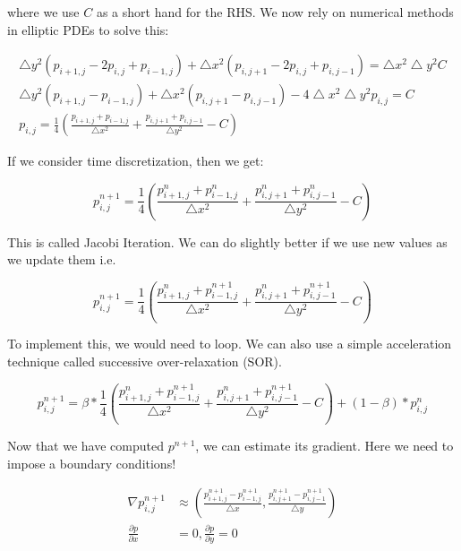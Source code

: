 \documentclass[12pt]{article}
\begin{document}
where we use $C$ as a short hand for the RHS. We now rely on numerical methods in elliptic PDEs to solve this:

\begin{align}
    \bigtriangleup y^2 (p_{i+1,j}-2p_{i,j}+p_{i-1,j}) + \bigtriangleup x^2 (p_{i,j+1}-2p_{i,j}+p_{i,j-1}) = \bigtriangleup x^2 \bigtriangleup y^2 C \\
    \bigtriangleup y^2 (p_{i+1,j} - p_{i-1,j}) + \bigtriangleup x^2 (p_{i,j+1} - p_{i,j-1}) - 4\bigtriangleup x^2 \bigtriangleup y^2 p_{i,j} = C \\
    p_{i,j} = \frac{1}{4}(\frac{p_{i+1,j} + p_{i-1,j}}{\bigtriangleup x^2} + \frac{p_{i,j+1} + p_{i,j-1}}{\bigtriangleup y^2} - C)
\end{align}

If we consider time discretization, then we get:

\begin{equation}
    p_{i,j}^{n+1} = \frac{1}{4}(\frac{p_{i+1,j}^n + p_{i-1,j}^n}{\bigtriangleup x^2} + \frac{p_{i,j+1}^n + p_{i,j-1}^n}{\bigtriangleup y^2} - C)
\end{equation}

This is called Jacobi Iteration. We can do slightly better if we use new values as we update them i.e.

\begin{equation}
    p_{i,j}^{n+1} = \frac{1}{4}(\frac{p_{i+1,j}^n + p_{i-1,j}^{n+1}}{\bigtriangleup x^2} + \frac{p_{i,j+1}^n + p_{i,j-1}^{n+1}}{\bigtriangleup y^2} - C)
\end{equation}

To implement this, we would need to loop. We can also use a simple acceleration technique called successive over-relaxation (SOR).

\begin{equation}
    p_{i,j}^{n+1} = \beta * \frac{1}{4}(\frac{p_{i+1,j}^n + p_{i-1,j}^{n+1}}{\bigtriangleup x^2} + \frac{p_{i,j+1}^n + p_{i,j-1}^{n+1}}{\bigtriangleup y^2} - C) + (1-\beta) * p_{i,j}^{n}
\end{equation}

Now that we have computed $p^{n+1}$, we can estimate its gradient. Here we need to impose a boundary conditions!

\begin{align*}
    \nabla p^{n+1}_{i,j} &\approx (\frac{p^{n+1}_{i+1,j} - p^{n+1}_{i-1,j}}{\bigtriangleup x}, \frac{p^{n+1}_{i,j+1} - p^{n+1}_{i,j-1}}{\bigtriangleup y}) \\
    \frac{\partial p}{\partial x} &= 0,
    \frac{\partial p}{\partial y} = 0
\end{align*}
\end{document}
